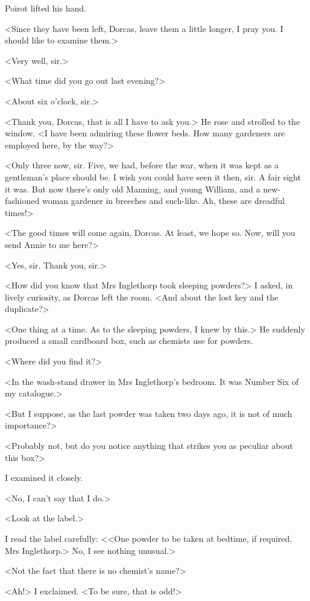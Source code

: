  Poirot lifted his hand. 

 <Since they have been left, Dorcas, leave them a little longer, I pray you. I should like to examine them.> 

 <Very well, sir.> 

 <What time did you go out last evening?> 

 <About six o'clock, sir.> 

 <Thank you, Dorcas, that is all I have to ask you.> He rose and strolled to the window. <I have been admiring these flower beds. How many gardeners are employed here, by the way?> 

 <Only three now, sir. Five, we had, before the war, when it was kept as a gentleman's place should be. I wish you could have seen it then, sir. A fair sight it was. But now there's only old Manning, and young William, and a new-fashioned woman gardener in breeches and such-like. Ah, these are dreadful times!> 

 <The good times will come again, Dorcas. At least, we hope so. Now, will you send Annie to me here?> 

 <Yes, sir. Thank you, sir.> 

 <How did you know that Mrs Inglethorp took sleeping powders?> I asked, in lively curiosity, as Dorcas left the room. <And about the lost key and the duplicate?> 

 <One thing at a time. As to the sleeping powders, I knew by this.> He suddenly produced a small cardboard box, such as chemists use for powders. 

 <Where did you find it?> 

 <In the wash-stand drawer in Mrs Inglethorp's bedroom. It was Number Six of my catalogue.> 

 <But I suppose, as the last powder was taken two days ago, it is not of much importance?> 

 <Probably not, but do you notice anything that strikes you as peculiar about this box?> 

 I examined it closely. 

 <No, I can't say that I do.> 

 <Look at the label.> 

 I read the label carefully: <<One powder to be taken at bedtime, if required. Mrs Inglethorp.> No, I see nothing unusual.> 

 <Not the fact that there is no chemist's name?> 

 <Ah!> I exclaimed. <To be sure, that is odd!> 

